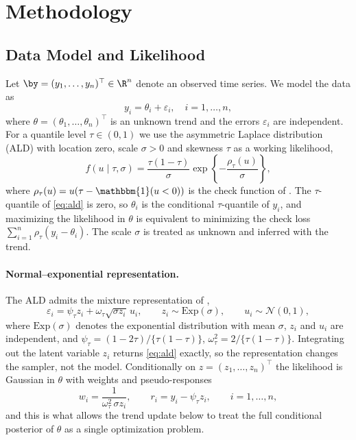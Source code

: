 \section{Methodology}
\label{sec:methodology}

\subsection{Data Model and Likelihood}
\label{subsec:model}

Let $\by = (y_1, \ldots, y_n)^\top \in \R^n$ denote an observed time series. We model the data as
\begin{equation}
    y_i = \theta_i + \varepsilon_i, \quad i = 1, \ldots, n,
    \label{eq:datamodel}
\end{equation}
where $\theta = (\theta_1, \ldots, \theta_n)^\top$ is an unknown trend and the errors $\varepsilon_i$ are independent. For a quantile level $\tau \in (0,1)$ we use the asymmetric Laplace distribution (ALD) with location zero, scale $\sigma > 0$ and skewness $\tau$ as a working likelihood,
\begin{equation}
    f(u \mid \tau, \sigma) = \frac{\tau(1-\tau)}{\sigma}
    \exp\!\left\{-\frac{\rho_\tau(u)}{\sigma}\right\},
    \label{eq:ald}
\end{equation}
where $\rho_\tau(u) = u(\tau - \mathbbm{1}(u < 0))$ is the check function of \citet{koenker1978regression}. The $\tau$-quantile of \eqref{eq:ald} is zero, so $\theta_i$ is the conditional $\tau$-quantile of $y_i$, and maximizing the likelihood in $\theta$ is equivalent to minimizing the check loss $\sum_{i=1}^n \rho_\tau(y_i-\theta_i)$. The scale $\sigma$ is treated as unknown and inferred with the trend.

\paragraph{Normal--exponential representation.} The ALD admits the mixture representation of \citet{kozumi2011gibbs},
\begin{equation}
    \varepsilon_i = \psi_\tau z_i + \omega_\tau \sqrt{\sigma z_i}\, u_i, \qquad z_i \sim \mathrm{Exp}(\sigma), \qquad u_i \sim \mathcal{N}(0,1),
    \label{eq:ald_mixture}
\end{equation}
where $\mathrm{Exp}(\sigma)$ denotes the exponential distribution with mean $\sigma$, $z_i$ and $u_i$ are independent, and $\psi_\tau = (1-2\tau)/\{\tau(1-\tau)\}$, $\omega_\tau^2 = 2/\{\tau(1-\tau)\}$. Integrating out the latent variable $z_i$ returns \eqref{eq:ald} exactly, so the representation changes the sampler, not the model. Conditionally on $z = (z_1,\ldots,z_n)^\top$ the likelihood is Gaussian in $\theta$ with weights and pseudo-responses
\begin{equation}
    w_i = \frac{1}{\omega_\tau^2\, \sigma z_i}, \qquad r_i = y_i - \psi_\tau z_i, \qquad i = 1,\ldots,n,
    \label{eq:weights}
\end{equation}
and this is what allows the trend update below to treat the full conditional posterior of $\theta$ as a single optimization problem.

